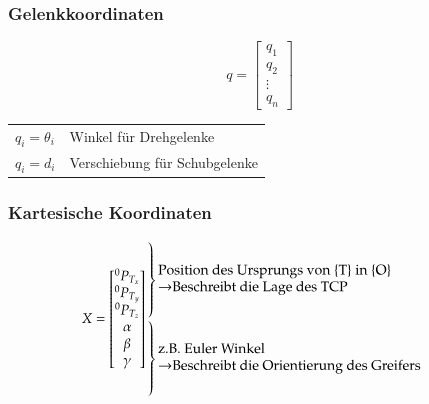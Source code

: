 \begin{multicols}{2}
    \begin{minipage}{\linewidth}
        \subsubsection{Gelenkkoordinaten}
        \vspace{-1cm}
        \[ q=\begin{bmatrix}
        q_1\\
        q_2\\
        \vdots\\
        q_n
        \end{bmatrix} \]
        \begin{tabular}{ll}
            $q_i = \theta_i$ & Winkel für Drehgelenke\\
            $q_i = d_i$& Verschiebung für Schubgelenke\\
        \end{tabular}
    \end{minipage}

    \begin{minipage}{\linewidth}
        \subsubsection{Kartesische Koordinaten}
        \vspace{-1cm}
        \[ X= \begin{bmatrix}
            {}^0 P_{T_x}\\
            {}^0 P_{T_y}\\
            {}^0 P_{T_z}\\
            \alpha\\
            \beta\\
            \gamma
            \end{bmatrix}           
    \begin{array}{@{\kern-\nulldelimiterspace}l@{}}
          \left.\begin{array}{@{}c@{}}
              \vphantom{\vdots}\\
              \vphantom{\vdots}\\
              \vphantom{\vdots}
          \end{array}\right\}
          \parbox{20em}{Position des Ursprungs von \{T\} in \{O\}\\
          $\rightarrow$Beschreibt die Lage des TCP }\\
          \left.\begin{array}{@{}c@{}}
              \vphantom{\vdots}\\
              \vphantom{\vdots}\\
              \vphantom{\vdots}
          \end{array}\right\}\parbox{20em}{z.B. Euler Winkel\\
              $\rightarrow$Beschreibt die Orientierung des Greifers }\\
      \end{array}
        \]
    \end{minipage}
\end{multicols}

